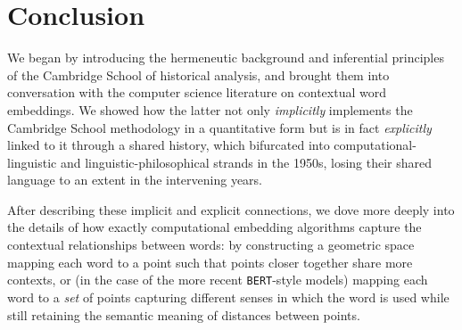 \documentclass[11pt]{article}
\newcommand{\BERT}[0]{\texttt{BERT}}
\begin{document}


\section{Conclusion}\label{sec:conclusion}

We began by introducing the hermeneutic background and inferential principles of the Cambridge School of historical analysis, and brought them into conversation with the computer science literature on contextual word embeddings. We showed how the latter not only \textit{implicitly} implements the Cambridge School methodology in a quantitative form but is in fact \textit{explicitly} linked to it through a shared history, which bifurcated into computational-linguistic and linguistic-philosophical strands in the 1950s, losing their shared language to an extent in the intervening years.

After describing these implicit and explicit connections, we dove more deeply into the details of how exactly computational embedding algorithms capture the contextual relationships between words: by constructing a geometric space mapping each word to a point such that points closer together share more contexts, or (in the case of the more recent \BERT{}-style models) mapping each word to a \textit{set} of points capturing different senses in which the word is used while still retaining the semantic meaning of distances between points.
\end{document}
